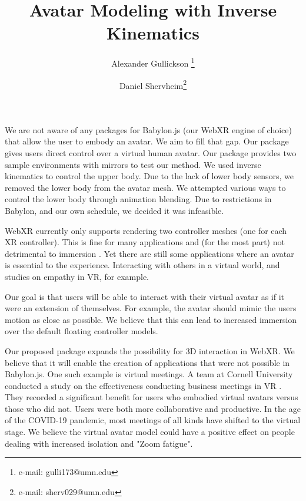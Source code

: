\documentclass{vgtc}                          %
\title{Avatar Modeling with Inverse Kinematics}
\author{Alexander Gullickson \thanks{e-mail: gulli173@umn.edu} %
\and Daniel Shervheim\thanks{e-mail: sherv029@umn.edu} }%
\begin{document}


\maketitle
    
    We are not aware of any packages for Babylon.js (our WebXR engine of choice) that allow the user to embody an avatar. We aim to fill that gap. Our package gives users direct control over a virtual human avatar. Our package provides two sample environments with mirrors to test our method. We used inverse kinematics to control the upper body. Due to the lack of lower body sensors, we removed the lower body from the avatar mesh. We attempted various ways to control the lower body through animation blending. Due to restrictions in Babylon, and our own schedule, we decided it was infeasible.
    
    WebXR currently only supports rendering two controller meshes (one for each XR controller). This is fine for many applications and (for the most part) not detrimental to immersion \cite{Bodiless}. Yet there are still some applications where an avatar is essential to the experience. Interacting with others in a virtual world, and studies on empathy in VR, for example.
    
    Our goal is that users will be able to interact with their virtual avatar as if it were an extension of themselves. For example, the avatar should mimic the users motion as close as possible. We believe that this can lead to increased immersion over the default floating controller models.

    Our proposed package expands the possibility for 3D interaction in WebXR. We believe that it will enable the creation of applications that were not possible in Babylon.js. One such example is virtual meetings. A team at Cornell University conducted a study on the effectiveness conducting business meetings in VR \cite{VR-Replay}.  They recorded a significant benefit for users who embodied virtual avatars versus those who did not. Users were both more collaborative and productive. In the age of the COVID-19 pandemic, most meetings of all kinds have shifted to the virtual stage. We believe the virtual avatar model could have a positive effect on people dealing with increased isolation and "Zoom fatigue".
    
\end{document}
